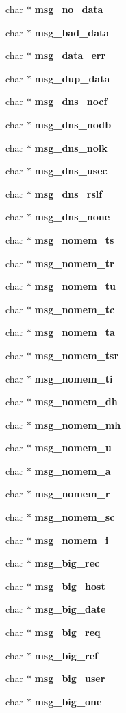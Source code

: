 \begin{CompactItemize}
\item 
char $\ast$ {\bf msg\_\-no\_\-data}
\item 
char $\ast$ {\bf msg\_\-bad\_\-data}
\item 
char $\ast$ {\bf msg\_\-data\_\-err}
\item 
char $\ast$ {\bf msg\_\-dup\_\-data}
\item 
char $\ast$ {\bf msg\_\-dns\_\-nocf}
\item 
char $\ast$ {\bf msg\_\-dns\_\-nodb}
\item 
char $\ast$ {\bf msg\_\-dns\_\-nolk}
\item 
char $\ast$ {\bf msg\_\-dns\_\-usec}
\item 
char $\ast$ {\bf msg\_\-dns\_\-rslf}
\item 
char $\ast$ {\bf msg\_\-dns\_\-none}
\item 
char $\ast$ {\bf msg\_\-nomem\_\-ts}
\item 
char $\ast$ {\bf msg\_\-nomem\_\-tr}
\item 
char $\ast$ {\bf msg\_\-nomem\_\-tu}
\item 
char $\ast$ {\bf msg\_\-nomem\_\-tc}
\item 
char $\ast$ {\bf msg\_\-nomem\_\-ta}
\item 
char $\ast$ {\bf msg\_\-nomem\_\-tsr}
\item 
char $\ast$ {\bf msg\_\-nomem\_\-ti}
\item 
char $\ast$ {\bf msg\_\-nomem\_\-dh}
\item 
char $\ast$ {\bf msg\_\-nomem\_\-mh}
\item 
char $\ast$ {\bf msg\_\-nomem\_\-u}
\item 
char $\ast$ {\bf msg\_\-nomem\_\-a}
\item 
char $\ast$ {\bf msg\_\-nomem\_\-r}
\item 
char $\ast$ {\bf msg\_\-nomem\_\-sc}
\item 
char $\ast$ {\bf msg\_\-nomem\_\-i}
\item 
char $\ast$ {\bf msg\_\-big\_\-rec}
\item 
char $\ast$ {\bf msg\_\-big\_\-host}
\item 
char $\ast$ {\bf msg\_\-big\_\-date}
\item 
char $\ast$ {\bf msg\_\-big\_\-req}
\item 
char $\ast$ {\bf msg\_\-big\_\-ref}
\item 
char $\ast$ {\bf msg\_\-big\_\-user}
\item 
char $\ast$ {\bf msg\_\-big\_\-one}
\item 

\end{CompactItemize}
